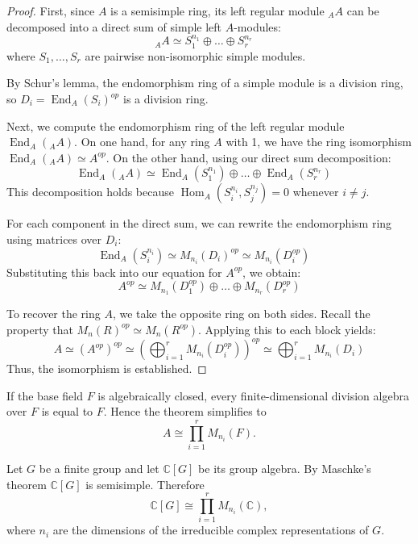 \documentclass[11pt, a4paper]{report}
\begin{document}
    \begin{proof}
    First, since $A$ is a semisimple ring, its left regular module ${}_A A$ can be decomposed into a direct sum of simple left $A$-modules:
    \[
    {}_A A \simeq S_1^{n_1} \oplus \dots \oplus S_r^{n_r} \quad 
    \]
    where $S_1, \dots, S_r$ are pairwise non-isomorphic simple modules.
    
    By Schur's lemma, the endomorphism ring of a simple module is a division ring, so $D_i = \operatorname{End}_A(S_i)^{op}$ is a division ring.
    
    Next, we compute the endomorphism ring of the left regular module $\operatorname{End}_A({}_A A)$. On one hand, for any ring $A$ with 1, we have the ring isomorphism $\operatorname{End}_A({}_A A) \simeq A^{op}$. On the other hand, using our direct sum decomposition:
    \[
    \operatorname{End}_A({}_A A) \simeq \operatorname{End}_A(S_1^{n_1}) \oplus \dots \oplus \operatorname{End}_A(S_r^{n_r}) \quad 
    \]
    This decomposition holds because $\operatorname{Hom}_A(S_i^{n_i}, S_j^{n_j}) = 0$ whenever $i \neq j$. 
    
    For each component in the direct sum, we can rewrite the endomorphism ring using matrices over $D_i$:
    \[
    \operatorname{End}_A(S_i^{n_i}) \simeq M_{n_i}(D_i)^{op} \simeq M_{n_i}(D_i^{op}) \quad 
    \]
    Substituting this back into our equation for $A^{op}$, we obtain:
    \[
    A^{op} \simeq M_{n_1}(D_1^{op}) \oplus \dots \oplus M_{n_r}(D_r^{op})
    \]
    
    To recover the ring $A$, we take the opposite ring on both sides. Recall the property that $M_n(R)^{op} \simeq M_n(R^{op})$. Applying this to each block yields:
    \[
    A \simeq (A^{op})^{op} \simeq \left( \bigoplus_{i=1}^r M_{n_i}(D_i^{op}) \right)^{op} \simeq \bigoplus_{i=1}^r M_{n_i}(D_i)
    \]
    Thus, the isomorphism is established.
\end{proof}
    
    \begin{remark}
    If the base field $F$ is algebraically closed, every finite-dimensional
    division algebra over $F$ is equal to $F$. Hence the theorem simplifies to
    \[
    A \cong \prod_{i=1}^{r} M_{n_i}(F).
    \]
    \end{remark}
    
    \begin{example}
    Let $G$ be a finite group and let $\mathbb{C}[G]$ be its group algebra.
    By Maschke's theorem $\mathbb{C}[G]$ is semisimple. Therefore
    \[
    \mathbb{C}[G] \cong \prod_{i=1}^{r} M_{n_i}(\mathbb{C}),
    \]
    where $n_i$ are the dimensions of the irreducible complex representations
    of $G$.
    \end{example}
\end{document}
